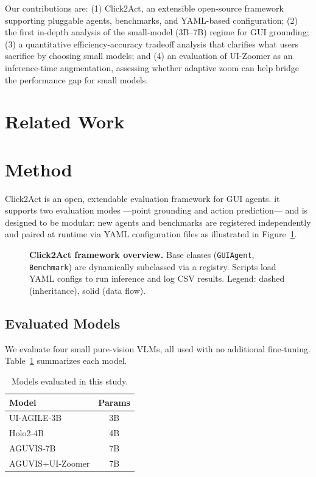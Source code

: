 \documentclass{article}
\theoremstyle{plain}
\theoremstyle{definition}
\theoremstyle{remark}
\begin{document}
Our contributions are: (1) Click2Act, an extensible open-source framework supporting pluggable agents, benchmarks, and YAML-based configuration; (2) the first in-depth analysis of the small-model (3B--7B) regime for GUI grounding; (3) a quantitative efficiency-accuracy tradeoff analysis that clarifies what users sacrifice by choosing small models; and (4) an evaluation of UI-Zoomer as an inference-time augmentation, assessing whether adaptive zoom can help bridge the performance gap for small models.

\section{Related Work}


\section{Method}

Click2Act is an open, extendable evaluation framework for GUI agents. it supports two evaluation modes ---point grounding and action prediction--- and is designed to be modular: new agents and benchmarks are registered independently and paired at runtime via YAML configuration files as illustrated in Figure~\ref{fig:framework}.

\begin{figure}[h]
    \centering
    
    \caption{%
        \textbf{Click2Act framework overview.} Base classes (\texttt{GUIAgent}, \texttt{Benchmark}) are dynamically subclassed via a registry. Scripts load YAML configs to run inference and log CSV results. Legend: dashed (inheritance), solid (data flow).
    }
    \label{fig:framework}
\end{figure}
\subsection{Evaluated Models}

We evaluate four small pure-vision VLMs, all used with  no additional fine-tuning. Table~\ref{tab:models} summarizes each model.
\begin{table}[h]
    \centering
    \caption{Models evaluated in this study.}
    \label{tab:models}
    \begin{tabular}{lc}
        \toprule
        \textbf{Model} & \textbf{Params} \\
        \midrule
        UI-AGILE-3B      & 3B \\
        Holo2-4B         & 4B \\
        AGUVIS-7B        & 7B \\
        AGUVIS+UI-Zoomer & 7B \\
        \bottomrule
    \end{tabular}
\end{table}
\end{document}
